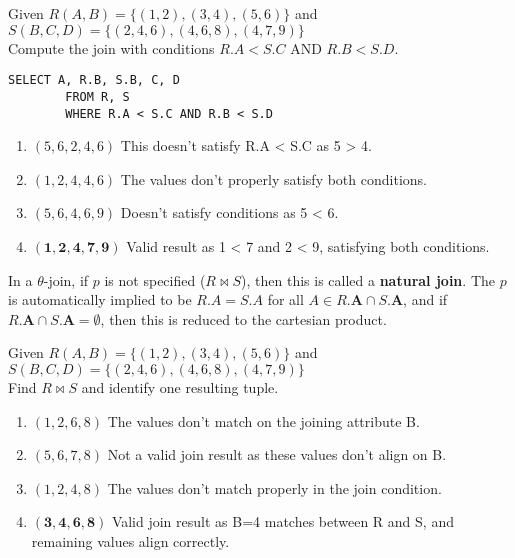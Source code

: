     \begin{example}
      Given $R(A,B) = \{(1,2), (3,4), (5,6)\}$ and\\
      $S(B,C,D) = \{(2,4,6), (4,6,8), (4,7,9)\}$\\
      Compute the join with conditions $R.A < S.C$ AND $R.B < S.D$.

      \begin{lstlisting}[basicstyle=\ttfamily]
        SELECT A, R.B, S.B, C, D
        FROM R, S
        WHERE R.A < S.C AND R.B < S.D
      \end{lstlisting}

      \begin{enumerate}
        \item $(5,6,2,4,6)$ This doesn't satisfy R.A < S.C as 5 > 4.
        
        \item $(1,2,4,4,6)$ The values don't properly satisfy both conditions.
        
        \item $(5,6,4,6,9)$ Doesn't satisfy conditions as 5 < 6.
        
        \item $\mathbf{(1,2,4,7,9)}$ Valid result as 1 < 7 and 2 < 9, satisfying both conditions.
      \end{enumerate}
    \end{example}

    \begin{definition}
      In a $\theta$-join, if $p$ is not specified ($R \bowtie S$), then this is called a \textbf{natural join}. The $p$ is automatically implied to be $R.A = S.A$ for all $A \in R.\mathbf{A} \cap S.\mathbf{A}$, and if $R.\mathbf{A} \cap S.\mathbf{A} = \emptyset$, then this is reduced to the cartesian product. 
    \end{definition}

    \begin{example}
      Given $R(A,B) = \{(1,2), (3,4), (5,6)\}$ and\\
      $S(B,C,D) = \{(2,4,6), (4,6,8), (4,7,9)\}$\\
      Find $R \bowtie S$ and identify one resulting tuple.

      \begin{enumerate}
        \item $(1,2,6,8)$ The values don't match on the joining attribute B.
        
        \item $(5,6,7,8)$ Not a valid join result as these values don't align on B.
        
        \item $(1,2,4,8)$ The values don't match properly in the join condition.
        
        \item $\mathbf{(3,4,6,8)}$ Valid join result as B=4 matches between R and S, and remaining values align correctly.
      \end{enumerate}
    \end{example}


